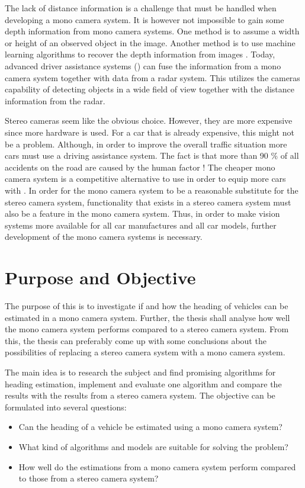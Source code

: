 The lack of distance information is a challenge that must be handled when developing a mono camera system.
It is however not impossible to gain some depth information from mono camera systems.
One method is to assume a width or height of an observed object in the image.
Another method is to use machine learning algorithms to recover the depth information from images \cite{Saxena:2008}.
Today, advanced driver assistance systems (\abbrADAS) can fuse the information from a mono camera system together with data from \eg a radar system.
This utilizes the cameras capability of detecting objects in a wide field of view together with the distance information from the radar.

Stereo cameras seem like the obvious choice.
However, they are more expensive since more hardware is used.
For a car that is already expensive, this might not be a problem.
Although, in order to improve the overall traffic situation more cars must use a driving assistance system.
The fact is that more than 90 \% of all accidents on the road are caused by the human factor \cite{EuroNCAP:2017}!
The cheaper mono camera system is a competitive alternative to use in order to equip more cars with \abbrADAS.
In order for the mono camera system to be a reasonable substitute for the stereo camera system, functionality that exists in a stereo camera system must also be a feature in the mono camera system.
Thus, in order to make vision systems more available for all car manufactures and all car models, further development of the mono camera systems is necessary.

\section{Purpose and Objective}
The purpose of this \ms is to investigate if and how the heading of vehicles can be estimated in a mono camera system.
Further, the thesis shall analyse how well the mono camera system performs compared to a stereo camera system.
From this, the thesis can preferably come up with some conclusions about the possibilities of replacing a stereo camera system with a mono camera system.

The main idea is to research the subject and find promising algorithms for heading estimation, implement and evaluate one algorithm and compare the results with the results from a stereo camera system.
The objective can be formulated into several questions:

\begin{itemize}
	\item Can the heading of a vehicle be estimated using a mono camera system?

	\item What kind of algorithms and models are suitable for solving the problem?

	\item How well do the estimations from a mono camera system perform compared to those from a stereo camera system?
\end{itemize}

